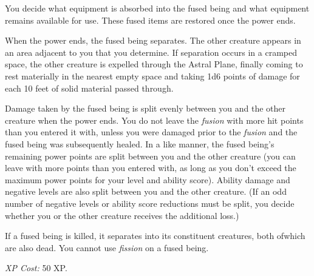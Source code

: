 \documentclass{article}
\begin{document}
You decide what equipment is absorbed into the fused being and what equipment remains 
available for use. These fused items are restored once the power ends.

When the power ends, the fused being separates. The other creature appears in an 
area adjacent to you that you determine. If separation occurs in a cramped space, 
the other creature is expelled through the Astral Plane, finally coming to rest 
materially in the nearest empty space and taking 1d6 points of damage for each 
10 feet of solid material passed through.

Damage taken by the fused being is split evenly between you and the other creature 
when the power ends. You do not leave the \textit{fusion }with more hit points 
than you entered it with, unless you were damaged prior to the \textit{fusion }and 
the fused being was subsequently healed. In a like manner, the fused being's remaining 
power points are split between you and the other creature (you can leave with more 
points than you entered with, as long as you don't exceed the maximum power points 
for your level and ability score). Ability damage and negative levels are also 
split between you and the other creature. (If an odd number of negative levels 
or ability score reductions must be split, you decide whether you or the other 
creature receives the additional loss.)

If a fused being is killed, it separates into its constituent creatures, both ofwhich 
are also dead. You cannot use \textit{fission }on a fused being.

\textit{XP Cost: }50 XP.

\newpage
\end{document}
